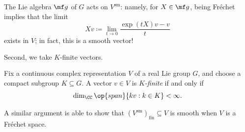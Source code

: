 \documentclass[../notes.tex]{subfiles}
\begin{document}
\begin{remark}
	The Lie algebra $\mf g$ of $G$ acts on $V^{\mathrm{sm}}$: namely, for $X\in\mf g$, being Fr\'echet implies that the limit
	\[Xv\coloneqq\lim_{t\to0}\frac{\exp(tX)v-v}t\]
	exists in $V$; in fact, this is a smooth vector!
\end{remark}
Second, we take $K$-finite vectors.
\begin{defihelper}[$K$-finite] 
	Fix a continuous complex representation $V$ of a real Lie group $G$, and choose a compact subgroup $K\subseteq G$. A vector $v\in V$ is \textit{$K$-finite} if and only if
	\[\dim_\CC\op{span}\{kv:k\in K\}<\infty.\]
\end{defihelper}
\begin{remark}
	A similar argument is able to show that $(V^{\mathrm{sm}})_{\mathrm{fin}}\subseteq V$ is smooth when $V$ is a Fr\'echet space.
\end{remark}
\end{document}
